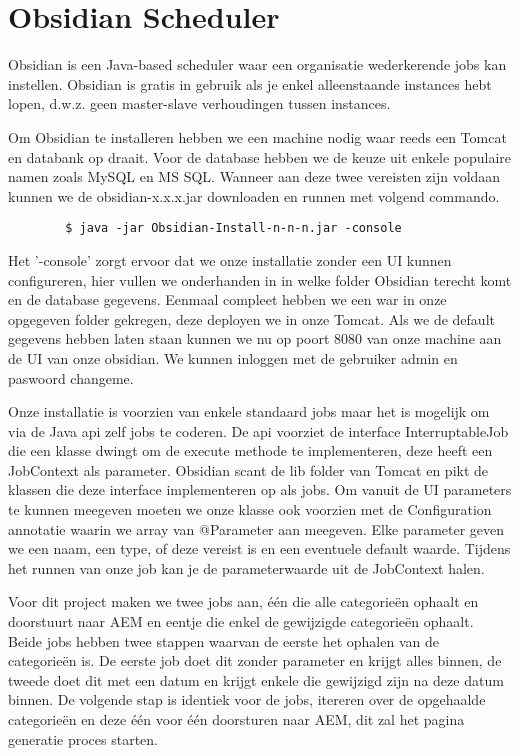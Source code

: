 \documentclass{article}
\begin{document}
	\section{Obsidian Scheduler}
	Obsidian is een Java-based scheduler waar een organisatie wederkerende jobs kan instellen. Obsidian is gratis in gebruik als je enkel alleenstaande instances hebt lopen, d.w.z. geen master-slave verhoudingen tussen instances.
	\par
	Om Obsidian te installeren hebben we een machine nodig waar reeds een Tomcat en databank op draait. Voor de database hebben we de keuze uit enkele populaire namen zoals MySQL en MS SQL. Wanneer aan deze twee vereisten zijn voldaan kunnen we de obsidian-x.x.x.jar downloaden en runnen met volgend commando. 
	\begin{lstlisting}
		$ java -jar Obsidian-Install-n-n-n.jar -console
	\end{lstlisting}
	Het '-console' zorgt ervoor dat we onze installatie zonder een UI kunnen configureren, hier vullen we onderhanden in in welke folder Obsidian terecht komt en de database gegevens. Eenmaal compleet hebben we een war in onze opgegeven folder gekregen, deze deployen we in onze Tomcat. Als we de default gegevens hebben laten staan kunnen we nu op poort 8080 van onze machine aan de UI van onze obsidian. We kunnen inloggen met de gebruiker admin en paswoord changeme.
	\par
	Onze installatie is voorzien van enkele standaard jobs maar het is mogelijk om via de Java api zelf jobs te coderen. De api voorziet de interface InterruptableJob die een klasse dwingt om de execute methode te implementeren, deze heeft een JobContext als parameter. Obsidian scant de lib folder van Tomcat en pikt de klassen die deze interface implementeren op als jobs. Om vanuit de UI parameters te kunnen meegeven moeten we onze klasse ook voorzien met de Configuration annotatie waarin we array van @Parameter aan meegeven. Elke parameter geven we een naam, een type, of deze vereist is en een eventuele default waarde. Tijdens het runnen van onze job kan je de parameterwaarde uit de JobContext halen.
	\par
	Voor dit project maken we twee jobs aan, \'e\'en die alle categorie\"en ophaalt en doorstuurt naar AEM en eentje die enkel de gewijzigde categorie\"en ophaalt. Beide jobs hebben twee stappen waarvan de eerste het ophalen van de categorie\"en is. De eerste job doet dit zonder parameter en krijgt alles binnen, de tweede doet dit met een datum en krijgt enkele die gewijzigd zijn na deze datum binnen. De volgende stap is identiek voor de jobs, itereren over de opgehaalde categorieën en deze \'e\'en voor \'e\'en doorsturen naar AEM, dit zal het pagina generatie proces starten.
\end{document}
